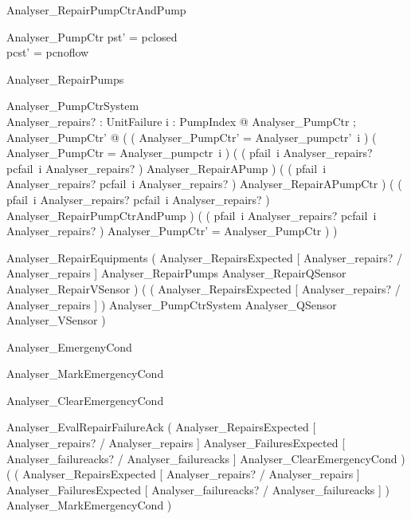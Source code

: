 \documentclass{article}
\begin{document}
\begin{schema}{Analyser\_RepairPumpCtrAndPump}

 \Delta Analyser\_PumpCtr 
\where
 pst' = pclosed \\
 pcst' = pcnoflow
\end{schema}

\begin{schema}{Analyser\_RepairPumps}

 \Delta Analyser\_PumpCtrSystem \\
 Analyser\_repairs? : \power UnitFailure 
\where
 \forall i : PumpIndex @ \exists Analyser\_PumpCtr ; Analyser\_PumpCtr' @ ( ( \theta Analyser\_PumpCtr' = Analyser\_pumpctr'~i ) \land ( \theta Analyser\_PumpCtr = Analyser\_pumpctr~i ) \land ( ( pfail~i \in Analyser\_repairs? \land pcfail~i \notin Analyser\_repairs? ) \implies Analyser\_RepairAPump ) \land ( ( pfail~i \notin Analyser\_repairs? \land pcfail~i \in Analyser\_repairs? ) \implies Analyser\_RepairAPumpCtr ) \land ( ( pfail~i \in Analyser\_repairs? \land pcfail~i \in Analyser\_repairs? ) \implies Analyser\_RepairPumpCtrAndPump ) \land ( ( pfail~i \notin Analyser\_repairs? \land pcfail~i \notin Analyser\_repairs? ) \implies \theta Analyser\_PumpCtr' = \theta Analyser\_PumpCtr ) )
\end{schema}

\begin{zed}
	Analyser\_RepairEquipments  ( Analyser\_RepairsExpected [ Analyser\_repairs? / Analyser\_repairs ] \land Analyser\_RepairPumps \land Analyser\_RepairQSensor \land Analyser\_RepairVSensor ) \lor ( ( \lnot Analyser\_RepairsExpected [ Analyser\_repairs? / Analyser\_repairs ] ) \land \Xi Analyser\_PumpCtrSystem \land \Xi Analyser\_QSensor \land \Xi Analyser\_VSensor )
\end{zed}

\begin{zed}
	Analyser\_EmergenyCond 
\end{zed}

\begin{zed}
	Analyser\_MarkEmergencyCond 
\end{zed}

\begin{zed}
	Analyser\_ClearEmergencyCond 
\end{zed}

\begin{zed}
	Analyser\_EvalRepairFailureAck  ( Analyser\_RepairsExpected [ Analyser\_repairs? / Analyser\_repairs ] \land Analyser\_FailuresExpected [ Analyser\_failureacks? / Analyser\_failureacks ] \land Analyser\_ClearEmergencyCond ) \lor ( ( \lnot Analyser\_RepairsExpected [ Analyser\_repairs? / Analyser\_repairs ] \lor \lnot Analyser\_FailuresExpected [ Analyser\_failureacks? / Analyser\_failureacks ] ) \land Analyser\_MarkEmergencyCond )
\end{zed}
\end{document}

